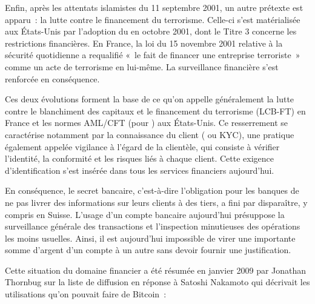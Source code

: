 Enfin, après les attentats islamistes du 11 septembre 2001, un autre prétexte est apparu~: la lutte contre le financement du terrorisme. Celle-ci s'est matérialisée aux États-Unis par l'adoption du  en octobre 2001, dont le Titre 3 concerne les restrictions financières. En France, la loi du 15 novembre 2001 relative à la sécurité quotidienne a requalifié «~le fait de financer une entreprise terroriste~» comme un acte de terrorisme en lui-même. La surveillance financière s'est renforcée en conséquence. %

Ces deux évolutions forment la base de ce qu'on appelle généralement la lutte contre le blanchiment des capitaux et le financement du terrorisme (LCB-FT) en France et les normes AML/CFT (pour ) aux États-Unis. Ce resserrement se caractérise notamment par la connaissance du client ( ou KYC), une pratique également appelée vigilance à l'égard de la clientèle, qui consiste à vérifier l'identité, la conformité et les risques liés à chaque client. Cette exigence d'identification s'est insérée dans tous les services financiers aujourd'hui.

En conséquence, le secret bancaire, c'est-à-dire l'obligation pour les banques de ne pas livrer des informations sur leurs clients à des tiers, a fini par disparaître, y compris en Suisse. L'usage d'un compte bancaire aujourd'hui présuppose la surveillance générale des transactions et l'inspection minutieuses des opérations les moins usuelles. Ainsi, il est aujourd'hui impossible de virer une importante somme d'argent d'un compte à un autre sans devoir fournir une justification.

Cette situation du domaine financier a été résumée en janvier 2009 par Jonathan Thornbug sur la liste de diffusion en réponse à Satoshi Nakamoto qui décrivait les utilisations qu'on pouvait faire de Bitcoin~:

